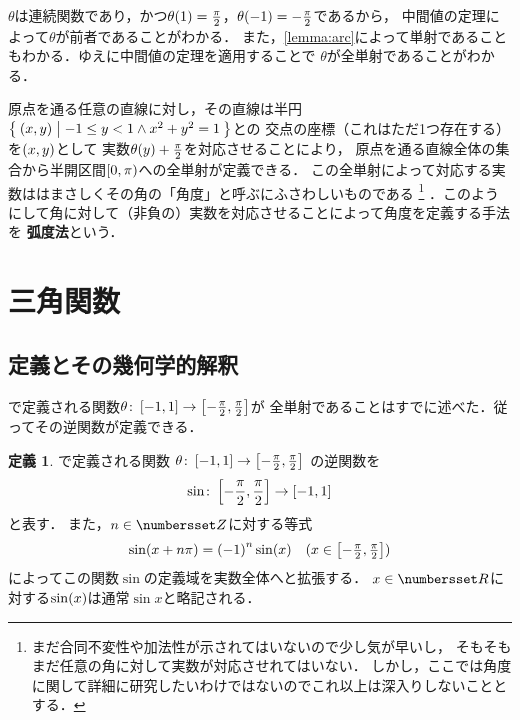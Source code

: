 \documentclass[11pt,a4paper]{ltjsarticle}
\newcommand*{\definition}[1]{\textbf{#1}}
\newcommand*{\coord}[1]{\paren{#1}}
\newcommand*{\maparrow}{\rightarrow}
\theoremstyle{definition}
\newtheorem{dfn}{定義}[section]
\begin{document}
$\theta$は連続関数であり，かつ$\apply{\theta}{1} = \frac{\pi}{2}$，$\apply{\theta}{-1} = - \frac{\pi}{2}$であるから，
中間値の定理によって$\theta$が前者であることがわかる．
また，\cref{lemma:arc}によって単射であることもわかる．ゆえに中間値の定理を適用することで
$\theta$が全単射であることがわかる．

原点を通る任意の直線に対し，その直線は半円$\setintension{\coord{x,y}}{-1 \leq y < 1 \land x^2 + y^2 = 1}$との
交点の座標（これはただ1つ存在する）を$\coord{x,y}$として
実数$\apply{\theta}{y} + \frac{\pi}{2}$を対応させることにより，
原点を通る直線全体の集合から半開区間$\interval{rop}{0,\pi}$への全単射が定義できる．
この全単射によって対応する実数ははまさしくその角の「角度」と呼ぶにふさわしいものである%
\footnote{%
  まだ合同不変性や加法性が示されてはいないので少し気が早いし，
  そもそもまだ任意の角に対して実数が対応させれてはいない．
  しかし，ここでは角度に関して詳細に研究したいわけではないのでこれ以上は深入りしないこととする．
}%
．このようにして角に対して（非負の）実数を対応させることによって角度を定義する手法を
\definition{弧度法}という．


\section{三角関数} \label{sec:sincostan}

\subsection{定義とその幾何学的解釈} \label{subsec:dfngeo}

で定義される関数$\theta \colon \interval{c}{-1,1} \maparrow \interval{c}{- \frac{\pi}{2}, \frac{\pi}{2}}$が
全単射であることはすでに述べた．従ってその逆関数が定義できる．

\begin{dfn} \label{dfn:sin}
  で定義される関数
  $\theta \colon \interval{c}{-1,1} \maparrow \interval{c}{- \frac{\pi}{2}, \frac{\pi}{2}}$
  の逆関数を
  \begin{align}
    \sin \colon \interval{c}{- \frac{\pi}{2}, \frac{\pi}{2}} \maparrow \interval{c}{-1,1}
    \label{eq:sin}
  \end{align}
  と表す．
  また，$n \in \Zahlen$に対する等式
  \begin{align}
    \apply{\sin}{x + n \pi} = \paren{-1}^n \apply{\sin}{x} \quad \text{($\textstyle x \in \interval{c}{-\frac{\pi}{2}, \frac{\pi}{2}}$)}
    \label{eq;sinperiod}
  \end{align}
  によってこの関数$\sin$の定義域を実数全体へと拡張する．
  $x \in \Real$に対する$\apply{\sin}{x}$は通常$\sin x$と略記される．
\end{dfn}
\end{document}
